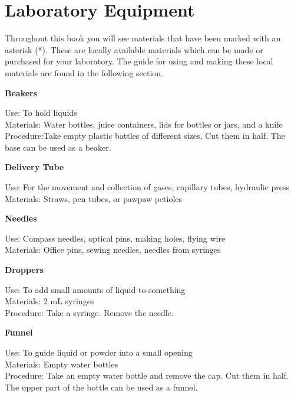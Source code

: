 \chapter{Laboratory Equipment}
Throughout this book you will see materials that have been marked with an asterisk (*). These are locally available materials which can be made or purchased for your laboratory. The guide for using and making these local materials are found in the following section.  

\begin{flushleft}
\textbf{Beakers}
\end{flushleft}
\vspace{-10pt}
Use: To hold liquids\\
Materials: Water bottles, juice containers, lids for bottles or jars, and a knife\\
Procedure:Take empty plastic battles of different sizes. Cut them in half. The base can be used as a beaker.  \\

\begin{flushleft}
\textbf{Delivery Tube}
\end{flushleft}
\vspace{-10pt}
Use: For the movement and collection of gases, capillary tubes, hydraulic press\\
Materials: Straws, pen tubes, or pawpaw petioles\\

\begin{flushleft}
\textbf{Needles}
\end{flushleft}
\vspace{-10pt}
Use: Compass needles, optical pins, making holes, flying wire\\
Materials: Office pins, sewing needles, needles from syringes\\

\begin{flushleft}
\textbf{Droppers}
\end{flushleft}
\vspace{-10pt}
Use: To add small amounts of liquid to something\\
Materials: 2 mL syringes\\
Procedure: Take a syringe. Remove the needle. \\

\begin{flushleft}
\textbf{Funnel}
\end{flushleft}
\vspace{-10pt}
Use: To guide liquid or powder into a small opening\\
Materials: Empty water bottles\\
Procedure: Take an empty water bottle and remove the cap. Cut them in half. The upper part of the bottle can be used as a funnel.  \\

